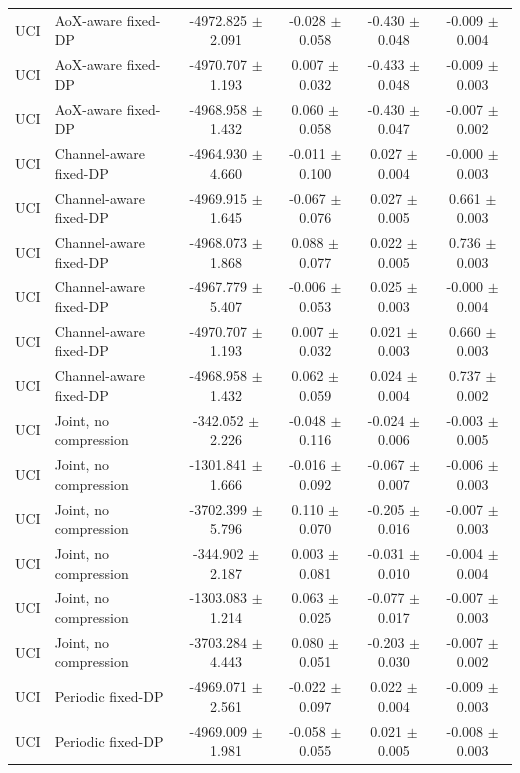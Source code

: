 \begin{tabular}{llcccc}
UCI & AoX-aware fixed-DP & -4972.825 $\pm$ 2.091 & -0.028 $\pm$ 0.058 & -0.430 $\pm$ 0.048 & -0.009 $\pm$ 0.004 \\
UCI & AoX-aware fixed-DP & -4970.707 $\pm$ 1.193 & 0.007 $\pm$ 0.032 & -0.433 $\pm$ 0.048 & -0.009 $\pm$ 0.003 \\
UCI & AoX-aware fixed-DP & -4968.958 $\pm$ 1.432 & 0.060 $\pm$ 0.058 & -0.430 $\pm$ 0.047 & -0.007 $\pm$ 0.002 \\
UCI & Channel-aware fixed-DP & -4964.930 $\pm$ 4.660 & -0.011 $\pm$ 0.100 & 0.027 $\pm$ 0.004 & -0.000 $\pm$ 0.003 \\
UCI & Channel-aware fixed-DP & -4969.915 $\pm$ 1.645 & -0.067 $\pm$ 0.076 & 0.027 $\pm$ 0.005 & 0.661 $\pm$ 0.003 \\
UCI & Channel-aware fixed-DP & -4968.073 $\pm$ 1.868 & 0.088 $\pm$ 0.077 & 0.022 $\pm$ 0.005 & 0.736 $\pm$ 0.003 \\
UCI & Channel-aware fixed-DP & -4967.779 $\pm$ 5.407 & -0.006 $\pm$ 0.053 & 0.025 $\pm$ 0.003 & -0.000 $\pm$ 0.004 \\
UCI & Channel-aware fixed-DP & -4970.707 $\pm$ 1.193 & 0.007 $\pm$ 0.032 & 0.021 $\pm$ 0.003 & 0.660 $\pm$ 0.003 \\
UCI & Channel-aware fixed-DP & -4968.958 $\pm$ 1.432 & 0.062 $\pm$ 0.059 & 0.024 $\pm$ 0.004 & 0.737 $\pm$ 0.002 \\
UCI & Joint, no compression & -342.052 $\pm$ 2.226 & -0.048 $\pm$ 0.116 & -0.024 $\pm$ 0.006 & -0.003 $\pm$ 0.005 \\
UCI & Joint, no compression & -1301.841 $\pm$ 1.666 & -0.016 $\pm$ 0.092 & -0.067 $\pm$ 0.007 & -0.006 $\pm$ 0.003 \\
UCI & Joint, no compression & -3702.399 $\pm$ 5.796 & 0.110 $\pm$ 0.070 & -0.205 $\pm$ 0.016 & -0.007 $\pm$ 0.003 \\
UCI & Joint, no compression & -344.902 $\pm$ 2.187 & 0.003 $\pm$ 0.081 & -0.031 $\pm$ 0.010 & -0.004 $\pm$ 0.004 \\
UCI & Joint, no compression & -1303.083 $\pm$ 1.214 & 0.063 $\pm$ 0.025 & -0.077 $\pm$ 0.017 & -0.007 $\pm$ 0.003 \\
UCI & Joint, no compression & -3703.284 $\pm$ 4.443 & 0.080 $\pm$ 0.051 & -0.203 $\pm$ 0.030 & -0.007 $\pm$ 0.002 \\
UCI & Periodic fixed-DP & -4969.071 $\pm$ 2.561 & -0.022 $\pm$ 0.097 & 0.022 $\pm$ 0.004 & -0.009 $\pm$ 0.003 \\
UCI & Periodic fixed-DP & -4969.009 $\pm$ 1.981 & -0.058 $\pm$ 0.055 & 0.021 $\pm$ 0.005 & -0.008 $\pm$ 0.003 \\

\end{tabular}
